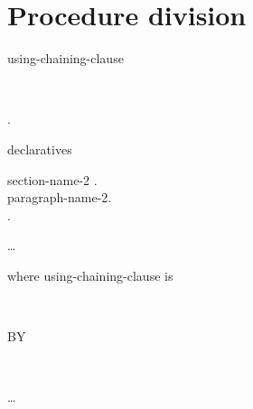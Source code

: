 \chapter{Procedure division}

 
\begin{0-1}
using-chaining-clause
\end{0-1}
\begin{0-1}
  \begin{1=}
    \identifier \\
  \end{1=}
\end{0-1}.\newline
\begin{0-1}
  declaratives
\end{0-1}\newline
\begin{0-1}
  section-name-2 . \\
  paragraph-name-2. \\
  \imperativestatement .
\end{0-1} \ldots

where using-chaining-clause is

\begin{1=}
   \\
\end{1=}

\begin{1=}
  BY
  \begin{1=}
     \\
  \end{1=}

  \begin{0-1}
  \end{0-1}
  \identifier
\end{1=}\ldots

